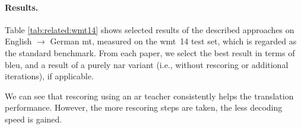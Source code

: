 
\paragraph{Results.} Table \ref{tab:related:wmt14} shows selected results of
the described approaches on English $\rightarrow$ German \ac{mt}, measured on
the \acs{wmt}~14 test set, which is regarded as the standard benchmark. From
each paper, we select the best result in terms of \acs{bleu}, and a result of a
purely \acl{nar} variant (i.e., without rescoring or additional iterations), if
applicable.

We can see that rescoring using an \acl{ar} teacher consistently helps the
translation performance. However, the more rescoring steps are taken, the less
decoding speed is gained. 


